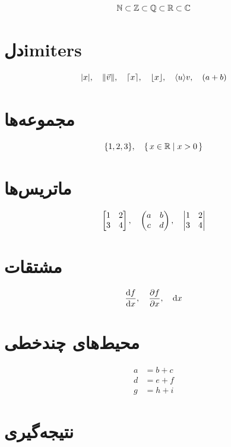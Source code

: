 \documentclass{matinbook}
\begin{document}
\[
    \mathbb{N} \subset \mathbb{Z} \subset \mathbb{Q} \subset \mathbb{R} \subset \mathbb{C}
\]

\section{دلimiters}
\label{sec:delimiters}

\[
    \lvert x\rvert, \quad \lVert\vec{v}\rVert, \quad \lceil x\rceil, \quad \lfloor x\rfloor, \quad \langle u\rangle{v}, \quad (a + b)
\]

\section{مجموعه‌ها}
\label{sec:sets}

\[
    \{1, 2, 3\}, \quad \{\, x \in \mathbb{R} \mid x > 0 \,\}
\]

\section{ماتریس‌ها}
\label{sec:matrices}

\[
    \begin{bmatrix}1 & 2 \\ 3 & 4\end{bmatrix}, \quad \begin{pmatrix}a & b \\ c & d\end{pmatrix}, \quad \begin{vmatrix}1 & 2 \\ 3 & 4\end{vmatrix}
\]

\section{مشتقات}
\label{sec:derivatives}

\[
    \frac{\mathrm{d}f}{\mathrm{d}x}, \quad \frac{\partial f}{\partial x}, \quad \mathrm{d}x
\]

\section{محیط‌های چندخطی}
\label{sec:align}

\begin{align}
    a &= b + c \\
    d &= e + f \\
    g &= h + i
\end{align}

\section{نتیجه‌گیری}
\label{sec:conclusion}
\end{document}
